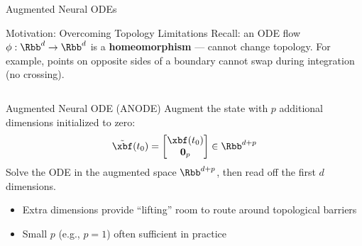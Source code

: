 \documentclass[aspectratio=169,xcolor=dvipsnames,svgnames,x11names,fleqn]{beamer}
\begin{document}
\begin{frame}{Augmented Neural ODEs}

\scriptsize

\begin{tblockFrost}{Motivation: Overcoming Topology Limitations}
Recall: an ODE flow $\phi: \Rbb^d \to \Rbb^d$ is a \textbf{homeomorphism} — cannot change topology. For example, points on opposite sides of a boundary cannot swap during integration (no crossing).
\end{tblockFrost}
\vspace{4pt}
\begin{columns}
\begin{block}{Augmented Neural ODE (ANODE)}
Augment the state with $p$ additional dimensions initialized to zero:
$$
  \tilde{\xbf}(t_0) = \begin{bmatrix} \xbf(t_0) \\ \mathbf{0}_p \end{bmatrix} \in \Rbb^{d+p}
$$
Solve the ODE in the augmented space $\Rbb^{d+p}$, then read off the first $d$ dimensions.
\begin{itemize}
  \item Extra dimensions provide ``lifting'' room to route around topological barriers
  \item Small $p$ (e.g., $p = 1$) often sufficient in practice
\end{itemize}
\end{block}
\end{columns}
\end{frame}
 
\end{document}

